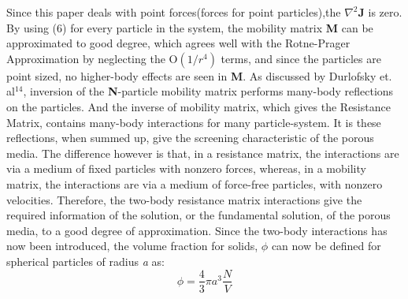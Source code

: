 \documentclass[12pt]{article}
\begin{document}
Since this paper deals with point forces(forces for point particles),the $\nabla ^2 \textbf{J}$ is zero. By using ($6$) for every particle in the system, the mobility matrix \textbf{M} can be approximated to  good degree, which agrees well with the Rotne-Prager Approximation by neglecting the O$(1/r^4)$ terms, and since the particles are point sized, no higher-body effects are seen in \textbf{M}. As discussed by Durlofsky et. al$^{14}$, inversion of the \textbf{N}-particle mobility matrix performs many-body reflections on the particles. And the inverse of mobility matrix, which gives the Resistance Matrix, contains many-body interactions for many particle-system. It is these reflections, when summed up, give the screening characteristic of the porous media. The difference however is that, in a resistance matrix, the interactions are via a medium of fixed particles with nonzero forces, whereas, in a mobility matrix, the interactions are via a medium of force-free particles, with nonzero velocities. Therefore, the two-body resistance matrix interactions give the required information of the solution, or the fundamental solution, of the porous media, to a good degree of approximation. Since the two-body interactions has now been introduced, the volume fraction for solids, $\phi$ can now be defined for spherical particles of radius \textit{a} as:
\begin{equation}
\label{eq7}
\phi=\frac{4}{3} \pi a^3 \frac{N}{V}
\end{equation}
\end{document}
